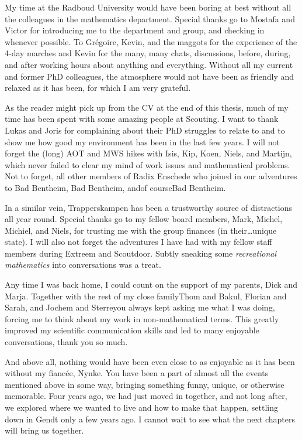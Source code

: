 My time at the Radboud University would have been boring at best without all the colleagues in the mathematics department.
Special thanks go to Mostafa and Victor for introducing me to the department and group, and checking in whenever possible.
To Grégoire, Kevin, and the maggots for the experience of the 4-day marches and Kevin for the many, many chats, discussions, before, during, and after working hours about anything and everything.
Without all my current and former PhD colleagues, the atmosphere would not have been as friendly and relaxed as it has been, for which I am very grateful.

As the reader might pick up from the CV at the end of this thesis, much of my time has been spent with some amazing people at Scouting.
I want to thank Lukas and Joris for complaining about their PhD struggles to relate to and to show me how good my environment has been in the last few years.
I will not forget the (long) AOT and MWS hikes with Isis, Kip, Koen, Niels, and Martijn, which never failed to clear my mind of work issues and mathematical problems.
Not to forget, all other members of Radix Enschede who joined in our adventures to Bad Bentheim, Bad Bentheim, and\textemdash of course\textemdash Bad Bentheim.

In a similar vein, Trapperskampen has been a trustworthy source of distractions all year round.
Special thanks go to my fellow board members, Mark, Michel, Michiel, and Niels, for trusting me with the group finances (in their\ldots unique state).
I will also not forget the adventures I have had with my fellow staff members during Extreem and Scoutdoor.
Subtly sneaking some \emph{recreational mathematics} into conversations was a treat.

Any time I was back home, I could count on the support of my parents, Dick and Marja.
Together with the rest of my close family\textemdash Thom and Bakul, Florian and Sarah, and Jochem and Sterre\textemdash you always kept asking me what I was doing, forcing me to think about my work in non-mathematical terms.
This greatly improved my scientific communication skills and led to many enjoyable conversations, thank you so much.

And above all, nothing would have been even close to as enjoyable as it has been without my fiancée, Nynke.
You have been a part of almost all the events mentioned above in some way, bringing something funny, unique, or otherwise memorable.
Four years ago, we had just moved in together, and not long after, we explored where we wanted to live and how to make that happen, settling down in Gendt only a few years ago.
I cannot wait to see what the next chapters will bring us together.
